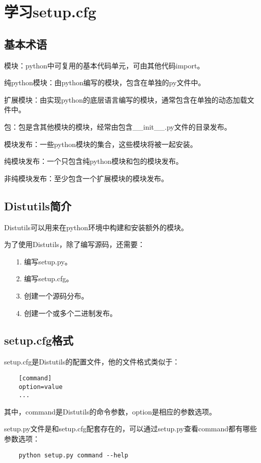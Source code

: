 \documentclass[a4paper,left=1.5cm,right=1.5cm,11pt]{article}
\begin{document}
\tableofcontents

\clearpage

\section{学习setup.cfg}
\subsection{基本术语}
	模块：python中可复用的基本代码单元，可由其他代码import。\par
	纯python模块：由python编写的模块，包含在单独的py文件中。\par
	扩展模块：由实现python的底层语言编写的模块，通常包含在单独的动态加载文件中。\par
	包：包是含其他模块的模块，经常由包含\_\_init\_\_.py文件的目录发布。\par
	模块发布：一些python模块的集合，这些模块将被一起安装。\par
	纯模块发布：一个只包含纯python模块和包的模块发布。\par
	非纯模块发布：至少包含一个扩展模块的模块发布。

\subsection{Distutils简介}
	Distutils可以用来在python环境中构建和安装额外的模块。\par

	为了使用Distutils，除了编写源码，还需要：
	\begin{itemize}
		\item[1.] 编写setup.py。
		\item[2.] 编写setup.cfg。
		\item[3.] 创建一个源码分布。
		\item[4.] 创建一个或多个二进制发布。
	\end{itemize}

\subsection{setup.cfg格式}
	setup.cfg是Distutils的配置文件，他的文件格式类似于：
	\begin{lstlisting}
	[command]
	option=value
	...
	\end{lstlisting}

	其中，command是Distutils的命令参数，option是相应的参数选项。\par

	setup.py文件是和setup.cfg配套存在的，可以通过setup.py查看command都有哪些参数选项：
	\begin{lstlisting}
	python setup.py command --help
	\end{lstlisting}
\end{document}
